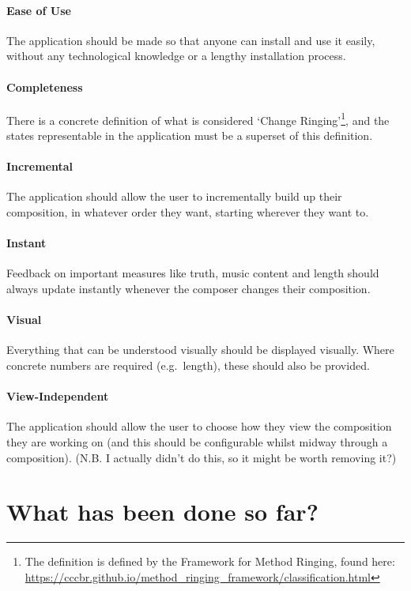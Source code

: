 \documentclass[12pt]{article}
\begin{document}
\paragraph{Ease of Use} The application should be made so that anyone can install and use it easily,
without any technological knowledge or a lengthy installation process.

\paragraph{Completeness} There is a concrete definition of what is considered `Change
Ringing'\footnote{The definition is defined by the Framework for Method Ringing, found here:
\url{https://cccbr.github.io/method_ringing_framework/classification.html}}, and the states
representable in the application must be a superset of this definition.

\paragraph{Incremental} The application should allow the user to incrementally build up their
composition, in whatever order they want, starting wherever they want to.

\paragraph{Instant} Feedback on important measures like truth, music content and length should
always update instantly whenever the composer changes their composition.

\paragraph{Visual} Everything that can be understood visually should be displayed visually.  Where
concrete numbers are required (e.g.\ length), these should also be provided.

\paragraph{View-Independent} The application should allow the user to choose how they view the
composition they are working on (and this should be configurable whilst midway through a
composition).  (N.B. I actually didn't do this, so it might be worth removing it?)



\pagebreak

\section{What has been done so far?}
\end{document}
